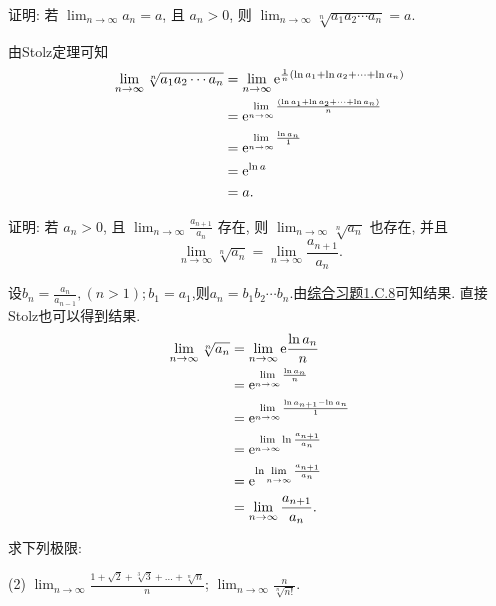\begin{exercise}[1.C.8]\label{exe:1.C.8}
    证明: 若 $\lim_{n \to \infty} a_n = a$, 且 $a_n > 0$, 则 $\lim_{n \to \infty} \sqrt[n]{a_1a_2\cdots a_n} = a$.
\end{exercise}
\begin{solution}
    由Stolz定理可知
    \begin{align*}
        \lim_{n \to \infty} \sqrt[n]{a_1a_2\cdots a_n} 
        &= \lim_{n \to \infty}\mathrm{e}^{\frac{1}{n}\left(\ln a_1+\ln a_2+\cdots +\ln a_n\right)} \\
        &= \mathrm{e}^{\lim\limits_{n \to \infty}\frac{\left(\ln a_1+\ln a_2+\cdots +\ln a_n\right)}{n}}\\
        &=\mathrm{e}^{\lim\limits_{n \to \infty}\frac{\ln a_n}{1}}\\
        &=\mathrm{e}^{\ln a}\\
        &=a.
    \end{align*} 
\end{solution}

\begin{exercise}[1.C.9]\label{exe:1.C.9}
    证明: 若 $a_n > 0$, 且 $\lim_{n \to \infty} \frac{a_{n+1}}{a_n}$ 存在, 则 $\lim_{n \to \infty} \sqrt[n]{a_n}$ 也存在, 并且
    $$ \lim_{n \to \infty} \sqrt[n]{a_n} = \lim_{n \to \infty} \frac{a_{n+1}}{a_n}. $$
\end{exercise}

\begin{solution}
    设$b_n=\frac{a_{n}}{a_{n-1}},(n>1);b_1=a_1$,则$a_n=b_1b_2\cdots b_n$.由\hyperref[exe:1.C.8]{综合习题1.C.8}可知结果.
    直接Stolz也可以得到结果.
    \begin{align*}
        \lim_{n \to \infty} \sqrt[n]{a_n} &=\lim_{n \to \infty} \mathrm{e}{\frac{\ln a_n}{n}}\\
        &=\mathrm{e}^{\lim\limits_{n \to \infty}\frac{\ln a_n}{n}}\\
        &=\mathrm{e}^{\lim\limits_{n \to \infty}\frac{\ln a_{n+1}-\ln a_{n}}{1}}\\
        &=\mathrm{e}^{\lim\limits_{n \to \infty}\ln \frac{a_{n+1}}{a_{n}}}\\
        &=\mathrm{e}^{\ln \lim\limits_{n \to \infty}\frac{a_{n+1}}{a_{n}}}\\
        &=\lim_{n \to \infty}\frac{a_{n+1}}{a_{n}}.
    \end{align*}
\end{solution}

\begin{exercise}[1.C.10]
    求下列极限:
    \begin{tasks}[label=(\arabic*)](2)
        \task $\lim_{n \to \infty} \frac{1+\sqrt{2}+\sqrt[3]{3}+\dots+\sqrt[n]{n}}{n}$;
        \task $\lim_{n \to \infty} \frac{n}{\sqrt[n]{n!}}$.
    \end{tasks}
\end{exercise}

